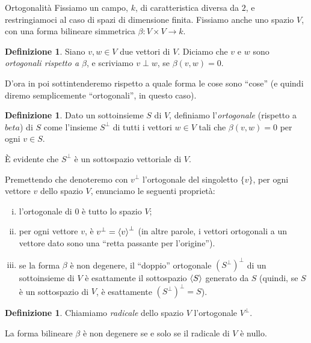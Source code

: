 \documentclass[a4paper]{amsproc}
\makeatletter
\theoremstyle{plain}
\theoremstyle{definition}
\newtheorem{dfn}[prp]{Definizione}
\theoremstyle{remark}
\DeclarePairedDelimiter{\cl}{\langle}{\rangle}
\def\paragraph{\@startsection{paragraph}{4}%
  \z@\z@{-\fontdimen2\font}%
  {\normalfont\bfseries}}
\makeatother
\begin{document}
\paragraph{Ortogonalità}
Fissiamo un campo, $ k $, di caratteristica diversa da $2 $, e restringiamoci al caso di spazi di dimensione finita. Fissiamo anche uno spazio $ V $, con una forma bilineare simmetrica $ \beta\colon V\times V\to k $.

\begin{dfn}
  Siano $ v,w\in V $ due vettori di $ V $. Diciamo che $ v $ e $ w $ sono \emph{ortogonali rispetto a $ \beta $}, e scriviamo $ v\perp w $, se $ \beta(v,w) = 0 $.
\end{dfn}

D'ora in poi sottintenderemo rispetto a quale forma le cose sono ``cose'' (e quindi diremo semplicemente ``ortogonali'', in questo caso).

\begin{dfn}
  Dato un sottoinsieme $ S $ di $ V $, definiamo l'\emph{ortogonale} (rispetto a $ beta $) di $ S $ come l'insieme $ S^\perp $ di tutti i vettori $ w\in V $ tali che $ \beta(v,w) = 0 $ per ogni $ v\in S $.
\end{dfn}

È evidente che $ S^\perp $ è un sottospazio vettoriale di $ V $.

Premettendo che denoteremo con $ v^\perp $ l'ortogonale del singoletto $ \{v\} $, per ogni vettore $ v $ dello spazio $ V $, enunciamo le seguenti proprietà:
\begin{enumerate}[(i)]
\item l'ortogonale di $ 0 $ è tutto lo spazio $ V $;
\item per ogni vettore $ v $, è $ v^\perp = {\cl v}^\perp $ (in altre parole, i vettori ortogonali a un vettore dato sono una ``retta passante per l'origine'').
\item se la forma $ \beta $ è non degenere, il ``doppio'' ortogonale $ \left(S^\perp\right)^\perp $ di un sottoinsieme di $ V $ è esattamente il sottospazio $ \cl S $ generato da $ S $ (quindi, se $ S $ è un sottospazio di $ V $, è esattamente $ \left(S^\perp\right)^\perp = S $).
\end{enumerate}

\begin{dfn}
  Chiamiamo \emph{radicale} dello spazio $ V $ l'ortogonale $ V^\perp $.
\end{dfn}

La forma bilineare $ \beta $ è non degenere se e solo se il radicale di $ V $ è nullo.
\end{document}
